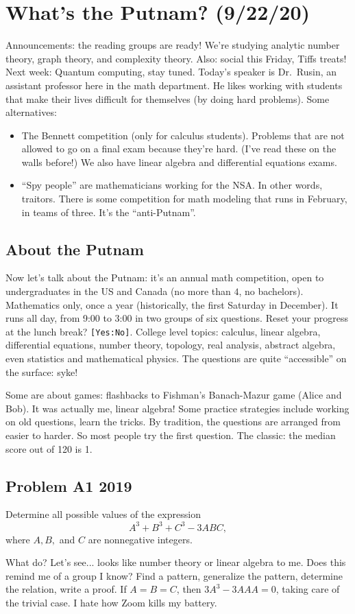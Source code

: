\section{What's the Putnam? (9/22/20)}
Announcements: the reading groups are ready! We're studying analytic number theory, graph theory, and complexity theory. Also: social this Friday, Tiffs treats! Next week: Quantum computing, stay tuned.
\orbreak
Today's speaker is Dr.\ Rusin, an assistant professor here in the math department. He likes working with students that make their lives difficult for themselves (by doing hard problems). Some alternatives:
\begin{itemize}
    \item The Bennett competition (only for calculus students). Problems that are not allowed to go on a final exam because they're hard. (I've read these on the walls before!) We also have linear algebra and differential equations exams.
    \item ``Spy people'' are mathematicians working for the NSA. In other words, traitors. There is some competition for math modeling that runs in February, in teams of three. It's the ``anti-Putnam''.
\end{itemize}

\subsection{About the Putnam}
Now let's talk about the Putnam: it's an annual math competition, open to undergraduates in the US and Canada (no more than $4$, no bachelors). Mathematics only, once a year (historically, the first Saturday in December). It runs all day, from 9:00 to 3:00 in two groups of six questions. Reset your progress at the lunch break? \texttt{[Yes:No]}. College level topics: calculus, linear algebra, differential equations, number theory, topology, real analysis, abstract algebra, even statistics and mathematical physics. The questions are quite ``accessible'' on the surface: syke!

Some are about games: flashbacks to Fishman's Banach-Mazur game (Alice and Bob). It was actually me, linear algebra! Some practice strategies include working on old questions, learn the tricks. By tradition, the questions are arranged from easier to harder. So most people try the first question. The classic: the median score out of 120 is 1.

\subsection{Problem A1 2019}
\begin{prob}
   Determine all possible values of the expression \[
   A^3+B^3+C^3-3ABC,
   \] where $A,B,$ and $C$ are nonnegative integers. 
\end{prob}
What do? Let's see... looks like number theory or linear algebra to me. Does this remind me of a group I know? Find a pattern, generalize the pattern, determine the relation, write a proof. If $A=B=C$, then $3A^3-3AAA=0$, taking care of the trivial case. I hate how Zoom kills my battery.

